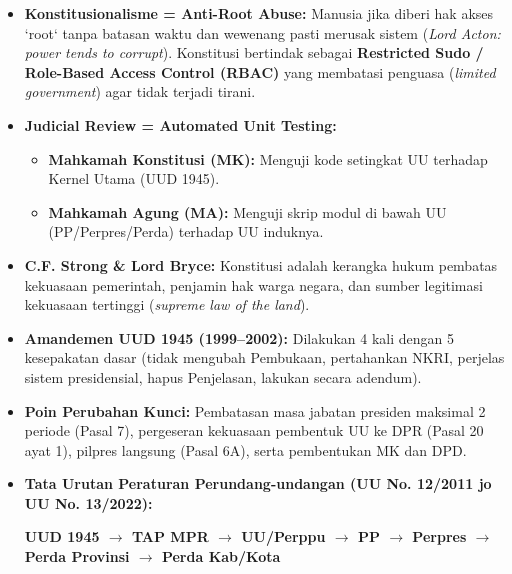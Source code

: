 \documentclass[10pt,a4paper]{article}
\begin{document}
\begin{analogibox}
\begin{itemize}
  \item \textbf{Konstitusionalisme = Anti-Root Abuse:} Manusia jika diberi hak akses `root` tanpa batasan waktu dan wewenang pasti merusak sistem (\textit{Lord Acton: power tends to corrupt}). Konstitusi bertindak sebagai \textbf{Restricted Sudo / Role-Based Access Control (RBAC)} yang membatasi penguasa (\textit{limited government}) agar tidak terjadi tirani.
  \item \textbf{Judicial Review = Automated Unit Testing:}
  \begin{itemize}
    \item \textbf{Mahkamah Konstitusi (MK):} Menguji kode setingkat UU terhadap Kernel Utama (UUD 1945).
    \item \textbf{Mahkamah Agung (MA):} Menguji skrip modul di bawah UU (PP/Perpres/Perda) terhadap UU induknya.
  \end{itemize}
\end{itemize}
\end{analogibox}

\begin{conceptbox}
\begin{itemize}
  \item \textbf{C.F. Strong \& Lord Bryce:} Konstitusi adalah kerangka hukum pembatas kekuasaan pemerintah, penjamin hak warga negara, dan sumber legitimasi kekuasaan tertinggi (\textit{supreme law of the land}).
  \item \textbf{Amandemen UUD 1945 (1999--2002):} Dilakukan 4 kali dengan 5 kesepakatan dasar (tidak mengubah Pembukaan, pertahankan NKRI, perjelas sistem presidensial, hapus Penjelasan, lakukan secara adendum).
  \item \textbf{Poin Perubahan Kunci:} Pembatasan masa jabatan presiden maksimal 2 periode (Pasal 7), pergeseran kekuasaan pembentuk UU ke DPR (Pasal 20 ayat 1), pilpres langsung (Pasal 6A), serta pembentukan MK dan DPD.
  \item \textbf{Tata Urutan Peraturan Perundang-undangan (UU No. 12/2011 jo UU No. 13/2022):}
  \begin{center}
  \textbf{UUD 1945 $\rightarrow$ TAP MPR $\rightarrow$ UU/Perppu $\rightarrow$ PP $\rightarrow$ Perpres $\rightarrow$ Perda Provinsi $\rightarrow$ Perda Kab/Kota}
  \end{center}
\end{itemize}
\end{conceptbox}
\end{document}
